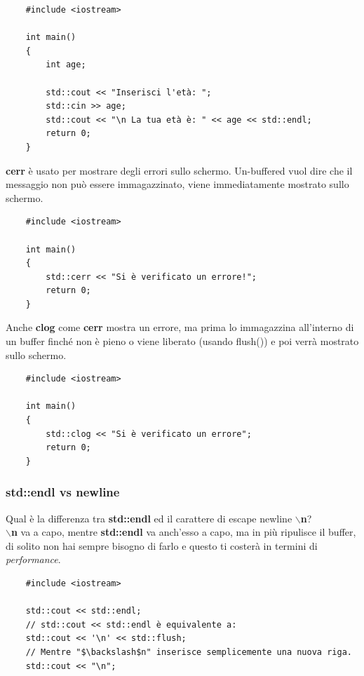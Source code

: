 \begin{lstlisting}
	#include <iostream>
	
	int main()
	{
		int age;
		
		std::cout << "Inserisci l'età: ";
		std::cin >> age;
		std::cout << "\n La tua età è: " << age << std::endl;
		return 0;
	}
\end{lstlisting}

\textsf{\small \textbf{cerr} è usato per mostrare degli errori sullo schermo. Un-buffered vuol dire che il messaggio non può essere immagazzinato, viene immediatamente mostrato sullo schermo.} \\

\begin{lstlisting}
	#include <iostream>
	
	int main()
	{
		std::cerr << "Si è verificato un errore!";
		return 0;
	}
\end{lstlisting}

\textsf{\small Anche \textbf{clog} come \textbf{cerr} mostra un errore, ma prima lo immagazzina all'interno di un buffer finché non è pieno o viene liberato (usando flush()) e poi verrà mostrato sullo schermo.} \\

\begin{lstlisting}
	#include <iostream>
	
	int main()
	{
		std::clog << "Si è verificato un errore";
		return 0;
	}
\end{lstlisting}

\subsubsection{std::endl vs newline}

\textsf{\small Qual è la differenza tra \textbf{std::endl} ed il carattere di escape newline \textbf{$\backslash$n}?} \\

\textsf{\small \textbf{$\backslash$n} va a capo, mentre \textbf{std::endl} va anch'esso a capo, ma in più ripulisce il buffer, di solito non hai sempre bisogno di farlo e questo ti costerà in termini di \emph{performance}.} \break

\begin{lstlisting}
	#include <iostream>
	
	std::cout << std::endl;
	// std::cout << std::endl è equivalente a:
	std::cout << '\n' << std::flush;
	// Mentre "$\backslash$n" inserisce semplicemente una nuova riga.
	std::cout << "\n";
\end{lstlisting} 

